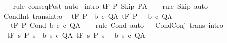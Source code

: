 \begin{isabellebody}
%
\isadelimproof
\ \ %
\endisadelimproof
%
\isatagproof
{}\isamarkupfalse%
\ {\isacharparenleft}rule\ conseqPost{\isacharparenright}\ auto%
\endisatagproof
{\isafoldproof}%
%
\isadelimproof
\isanewline
%
\endisadelimproof
\isanewline
{}\isamarkupfalse%
\ {\isacharbrackleft}intro{\isacharquery}{\isacharbrackright}{\isacharcolon}\ {\isachardoublequoteopen}{\isasymGamma}{\isacharcomma}{\isasymTheta}{\isasymturnstile}\isactrlsub t\isactrlbsub {\isacharslash}F\isactrlesub \ P\ Skip\ P{\isacharcomma}A{\isachardoublequoteclose}\isanewline
%
\isadelimproof
\ \ %
\endisadelimproof
%
\isatagproof
{}\isamarkupfalse%
\ {\isacharparenleft}rule\ Skip{\isacharparenright}\ auto%
\endisatagproof
{\isafoldproof}%
%
\isadelimproof
\isanewline
%
\endisadelimproof
\isanewline
{}\isamarkupfalse%
\ CondInt\ {\isacharbrackleft}trans{\isacharcomma}intro{\isacharquery}{\isacharbrackright}{\isacharcolon}\isanewline
\ \ {\isachardoublequoteopen}{\isasymlbrakk}{\isasymGamma}{\isacharcomma}{\isasymTheta}{\isasymturnstile}\isactrlsub t\isactrlbsub {\isacharslash}F\isactrlesub \ {\isacharparenleft}P\ {\isasyminter}\ b{\isacharparenright}\ c{}\ Q{\isacharcomma}A{\isacharsemicolon}\ {\isasymGamma}{\isacharcomma}{\isasymTheta}{\isasymturnstile}\isactrlsub t\isactrlbsub {\isacharslash}F\isactrlesub \ {\isacharparenleft}P\ {\isasyminter}\ {\isacharminus}\ b{\isacharparenright}\ c{}\ Q{\isacharcomma}A{\isasymrbrakk}\isanewline
\ \ \ {\isasymLongrightarrow}\isanewline
\ \ \ {\isasymGamma}{\isacharcomma}{\isasymTheta}{\isasymturnstile}\isactrlsub t\isactrlbsub {\isacharslash}F\isactrlesub \ P\ {\isacharparenleft}Cond\ b\ c{}\ c{}{\isacharparenright}\ Q{\isacharcomma}A{\isachardoublequoteclose}\isanewline
%
\isadelimproof
\ \ %
\endisadelimproof
%
\isatagproof
{}\isamarkupfalse%
\ {\isacharparenleft}rule\ Cond{\isacharparenright}\ auto%
\endisatagproof
{\isafoldproof}%
%
\isadelimproof
\isanewline
%
\endisadelimproof
\ \isanewline
{}\isamarkupfalse%
\ CondConj\ {\isacharbrackleft}trans{\isacharcomma}\ intro{\isacharquery}{\isacharbrackright}{\isacharcolon}\isanewline
\ \ {\isachardoublequoteopen}{\isasymlbrakk}{\isasymGamma}{\isacharcomma}{\isasymTheta}{\isasymturnstile}\isactrlsub t\isactrlbsub {\isacharslash}F\isactrlesub \ {\isacharbraceleft}s{\isachardot}\ P\ s\ {\isasymand}\ b\ s{\isacharbraceright}\ c{}\ Q{\isacharcomma}A{\isacharsemicolon}\ {\isasymGamma}{\isacharcomma}{\isasymTheta}{\isasymturnstile}\isactrlsub t\isactrlbsub {\isacharslash}F\isactrlesub \ {\isacharbraceleft}s{\isachardot}\ P\ s\ {\isasymand}\ {\isasymnot}\ b\ s{\isacharbraceright}\ c{}\ Q{\isacharcomma}A{\isasymrbrakk}\isanewline

\end{isabellebody}
